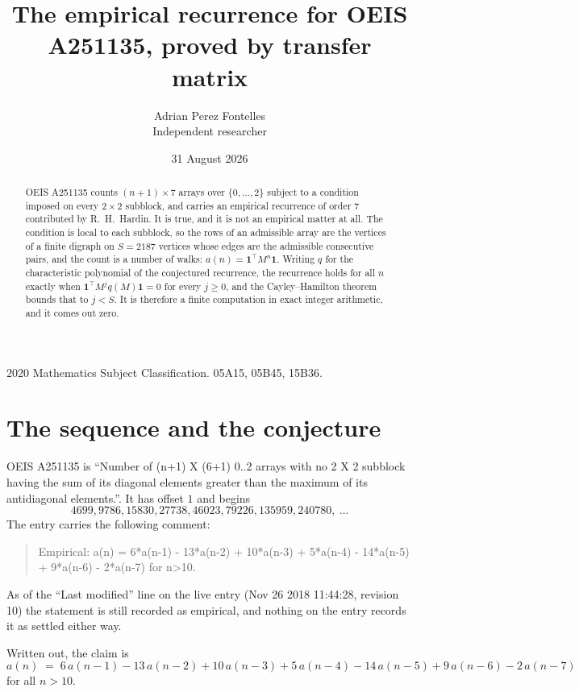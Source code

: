 \documentclass[11pt,a4paper]{article}
\title{The empirical recurrence for OEIS A251135, proved by transfer matrix}
\author{Adrian Perez Fontelles\\ \small Independent researcher}
\date{31 August 2026}
\theoremstyle{plain}
\theoremstyle{definition}
\begin{document}
\maketitle

\begin{abstract}
OEIS A251135 counts $(n+1)\times7$ arrays over $\{0,\dots,2\}$ subject to a condition imposed on
every $2\times2$ subblock, and carries an empirical recurrence of order $7$ contributed
by R.~H.~Hardin. It is true, and it is not an empirical matter at all. The condition is local
to each subblock, so the rows of an admissible array are the vertices of a finite digraph
on $S=2187$ vertices whose edges are the admissible consecutive pairs, and the count is a
number of walks: $a(n)=\mathbf{1}^{\!\top}M^{n}\mathbf{1}$. Writing $q$
for the characteristic polynomial of the conjectured recurrence, the recurrence holds for all
$n$ exactly when $\mathbf{1}^{\!\top}M^{j}q(M)\mathbf{1}=0$ for every $j\ge0$, and the
Cayley--Hamilton theorem bounds that to $j<S$. It is therefore a finite computation in exact
integer arithmetic, and it comes out zero.
\end{abstract}

\noindent\small 2020 Mathematics Subject Classification. 05A15, 05B45, 15B36.\normalsize

\section{The sequence and the conjecture}

OEIS A251135 is ``Number of (n+1) X (6+1) 0..2 arrays with no 2 X 2 subblock having the sum of its diagonal elements greater than the maximum of its antidiagonal elements.''. It has offset $1$ and begins
\[
4699, 9786, 15830, 27738, 46023, 79226, 135959, 240780,\ \dots
\]
The entry carries the following comment:
\begin{quote}\small
Empirical: a(n) = 6*a(n-1) - 13*a(n-2) + 10*a(n-3) + 5*a(n-4) - 14*a(n-5) + 9*a(n-6) - 2*a(n-7) for n>10.
\end{quote}
As of the ``Last modified'' line on the live entry (Nov 26 2018 11:44:28, revision 10) the statement is
still recorded as empirical, and nothing on the entry records it as settled either way.

Written out, the claim is
\begin{equation}\label{eq:conj}
a(n)\;=\;6\,a(n-1) - 13\,a(n-2) + 10\,a(n-3) + 5\,a(n-4) - 14\,a(n-5) + 9\,a(n-6) - 2\,a(n-7)
\end{equation}
for all $n>10$.
\end{document}
